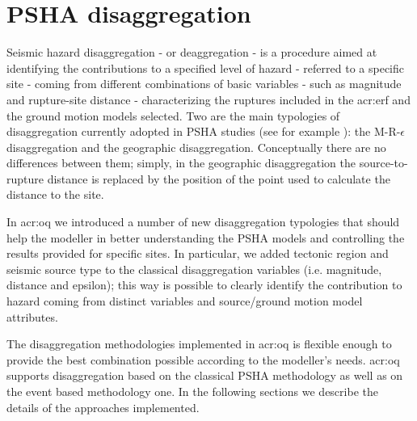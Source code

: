 %
\clearpage\newpage
\section{PSHA disaggregation}
\label{sec:disaggregation}
%
Seismic hazard disaggregation - or deaggregation - 
\citep{mcguire1995,bazzurro1999} is a procedure aimed at identifying the 
contributions to a specified level of hazard -  referred to a specific site -
coming from different combinations of basic variables - such as magnitude
and rupture-site distance - characterizing the ruptures included in the 
\gls{acr:erf} and the ground motion models selected.
%
Two are the main typologies of disaggregation currently adopted in PSHA 
studies (see for example \citet{petersen2008}): the M-R-$\epsilon$ 
disaggregation and the geographic disaggregation. 
%
Conceptually there are no differences between them; 
simply, in the geographic disaggregation the source-to-rupture 
distance is replaced by the position of the point used to calculate
the distance to the site.
%

In \gls{acr:oq} we introduced a number of new disaggregation typologies 
that should help the modeller in better understanding the PSHA models   
and controlling the results provided for specific sites.
% 
In particular, we added tectonic region and seismic source type to 
the classical disaggregation variables (i.e. magnitude, distance and
epsilon); this way is possible to clearly identify the contribution to 
hazard coming from distinct variables and source/ground motion model
attributes.

The disaggregation methodologies implemented in \gls{acr:oq} is flexible 
enough to provide the best combination possible according to the 
modeller's needs.
% 
\gls{acr:oq} supports disaggregation based on the classical PSHA 
methodology as well as on the event based methodology one. In the 
following sections we describe the details of the approaches
implemented.
%
